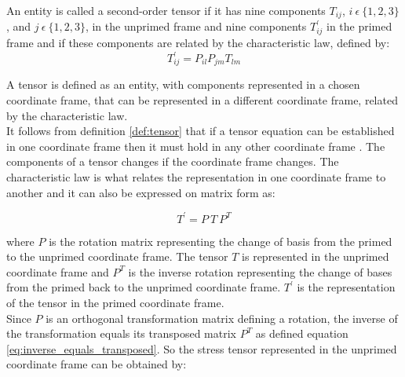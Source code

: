 \begin{definition}
\label{def:tensor}
An entity is called a second-order tensor if
it has nine components $T_{ij}$, $i \ \epsilon \ \lbrace 1,2,3
\rbrace$, and $j \ \epsilon \ \lbrace 1,2,3 \rbrace$, in the 
unprimed frame and nine components $T^\prime_{ij}$ in the primed frame and
if these components are related by the characteristic law, defined by:
\begin {equation}
\label{eq:bathe_2_60}
T^\prime_{ij} = P_{il} P_{jm} T_{lm}
\end {equation}
 
\end{definition}

A tensor is defined as an entity,
with components represented in a chosen coordinate frame, that can be
represented in a different coordinate frame, related by the
characteristic law. \\ 

It follows
from definition \vref{def:tensor} that if a tensor equation can be
established in one coordinate frame then it must hold in any other
coordinate frame . The components of a tensor changes if
the coordinate frame changes. The characteristic law is what 
relates the representation in one coordinate frame to another and it
can also be expressed on matrix form as:



\begin{equation}
\label{eq:primed_stress_tensor}
T^\prime = P \ T \ P^T
\end{equation}

where $P$ is the rotation matrix representing the change of basis from
the primed to the unprimed coordinate frame. The tensor $T$ is  
represented in the unprimed coordinate frame and $P^T$ is the
inverse rotation representing the change of bases from the primed back
to the unprimed coordinate frame. $T^\prime$ is the representation of
the tensor in the primed coordinate frame. \\

Since $P$ is an orthogonal transformation matrix defining a rotation,
the inverse of the transformation equals its transposed matrix
$P^T$ as defined equation \eqref{eq:inverse_equals_transposed}. So the stress tensor
represented in the unprimed coordinate frame can be obtained by:

